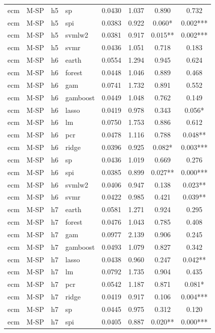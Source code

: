 \begin{ThreePartTable}
\begin{longtable}[t]{llclcccc}
ecm & M-SP & h5 & sp & 0.0430 & 1.037 & 0.890 & 0.732\\
ecm & M-SP & h5 & spi & 0.0383 & 0.922 & 0.060* & 0.002***\\
ecm & M-SP & h5 & svmlw2 & 0.0381 & 0.917 & 0.015** & 0.002***\\
ecm & M-SP & h5 & svmr & 0.0436 & 1.051 & 0.718 & 0.183\\
\addlinespace
ecm & M-SP & h6 & earth & 0.0554 & 1.294 & 0.945 & 0.624\\
ecm & M-SP & h6 & forest & 0.0448 & 1.046 & 0.889 & 0.468\\
ecm & M-SP & h6 & gam & 0.0741 & 1.732 & 0.891 & 0.552\\
ecm & M-SP & h6 & gamboost & 0.0449 & 1.048 & 0.762 & 0.149\\
ecm & M-SP & h6 & lasso & 0.0419 & 0.978 & 0.343 & 0.056*\\
ecm & M-SP & h6 & lm & 0.0750 & 1.753 & 0.886 & 0.612\\
ecm & M-SP & h6 & pcr & 0.0478 & 1.116 & 0.788 & 0.048**\\
ecm & M-SP & h6 & ridge & 0.0396 & 0.925 & 0.082* & 0.003***\\
ecm & M-SP & h6 & sp & 0.0436 & 1.019 & 0.669 & 0.276\\
ecm & M-SP & h6 & spi & 0.0385 & 0.899 & 0.027** & 0.000***\\
ecm & M-SP & h6 & svmlw2 & 0.0406 & 0.947 & 0.138 & 0.023**\\
ecm & M-SP & h6 & svmr & 0.0422 & 0.985 & 0.421 & 0.039**\\
\addlinespace
ecm & M-SP & h7 & earth & 0.0581 & 1.271 & 0.924 & 0.295\\
ecm & M-SP & h7 & forest & 0.0476 & 1.043 & 0.785 & 0.408\\
ecm & M-SP & h7 & gam & 0.0977 & 2.139 & 0.906 & 0.245\\
ecm & M-SP & h7 & gamboost & 0.0493 & 1.079 & 0.827 & 0.342\\
ecm & M-SP & h7 & lasso & 0.0438 & 0.960 & 0.247 & 0.042**\\
ecm & M-SP & h7 & lm & 0.0792 & 1.735 & 0.904 & 0.435\\
ecm & M-SP & h7 & pcr & 0.0542 & 1.187 & 0.871 & 0.081*\\
ecm & M-SP & h7 & ridge & 0.0419 & 0.917 & 0.106 & 0.004***\\
ecm & M-SP & h7 & sp & 0.0445 & 0.975 & 0.312 & 0.120\\
ecm & M-SP & h7 & spi & 0.0405 & 0.887 & 0.020** & 0.000***\\

\end{longtable}
\end{ThreePartTable}
